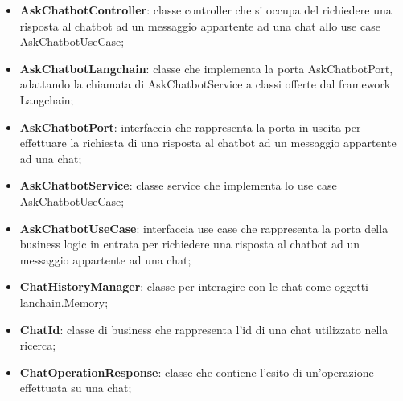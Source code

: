 \documentclass[10pt, a4paper]{article}
\begin{document}
\begin{itemize}
    \item \label{AskChatbotController}\textbf{AskChatbotController}: classe controller che si occupa del richiedere una risposta al chatbot ad un messaggio appartente ad una chat allo use case AskChatbotUseCase;
    \item \label{AskChatbotLangchain}\textbf{AskChatbotLangchain}: classe che implementa la porta AskChatbotPort, adattando la chiamata di AskChatbotService a classi offerte dal framework Langchain;
    \item \label{AskChatbotPort}\textbf{AskChatbotPort}: interfaccia che rappresenta la porta in uscita per effettuare la richiesta di una risposta al chatbot ad un messaggio appartente ad una chat;%
    \item \label{AskChatbotService}\textbf{AskChatbotService}: classe service che implementa lo use case AskChatbotUseCase;
    \item \label{AskChatbotUseCase}\textbf{AskChatbotUseCase}: interfaccia use case che rappresenta la porta della business logic in entrata per richiedere una risposta al chatbot ad un messaggio appartente ad una chat;
    \item \label{ChatHistoryManager}\textbf{ChatHistoryManager}: classe per interagire con le chat come oggetti lanchain.Memory;
    \item \label{ChatId}\textbf{ChatId}: classe di business che rappresenta l'id di una chat utilizzato nella ricerca;
    \item \label{ChatOperationResponse}\textbf{ChatOperationResponse}: classe che contiene l'esito di un'operazione effettuata su una chat;

    


\end{itemize}
\end{document}
